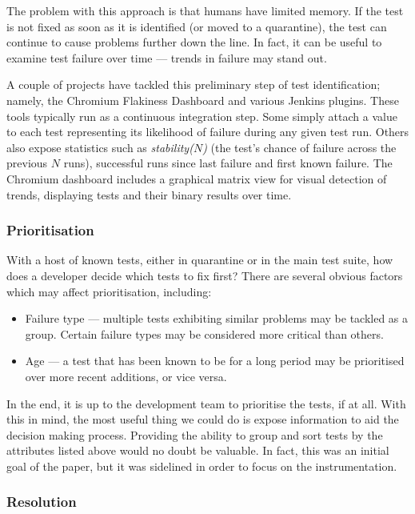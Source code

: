 The problem with this approach is that humans have limited memory. If the \flaky
test is not fixed as soon as it is identified (or moved to a quarantine), the
test can continue to cause problems further down the line. In fact, it can be
useful to examine test failure over time --- trends in failure may stand out.

A couple of projects have tackled this preliminary step of \flaky test
identification; namely, the Chromium Flakiness
Dashboard\cite{flakinessDashboard} and various Jenkins plugins. These tools
typically run as a continuous integration step. Some simply attach a value to
each test representing its likelihood of failure during any given test run.
Others also expose statistics such as \emph{stability($N$)} (the test's chance
of failure across the previous $N$ runs), successful runs since last failure and
first known failure. The Chromium dashboard includes a graphical matrix view for
visual detection of trends, displaying tests and their binary results over time.

\subsubsection{Prioritisation}

With a host of known \flaky tests, either in quarantine or in the main test
suite, how does a developer decide which tests to fix first? There are several
obvious factors which may affect prioritisation, including:
\begin{itemize}
	\item Failure type --- multiple \flaky tests exhibiting similar problems may
	be tackled as a group. Certain failure types may be considered more critical than others.
	\item Age --- a \flaky test that has been known to be \flaky for a long period
	may be prioritised over more recent additions, or vice versa.
\end{itemize}

In the end, it is up to the development team to prioritise the \flaky tests, if
at all. With this in mind, the most useful thing we could do is expose
information to aid the decision making process. Providing the ability to group
and sort \flaky tests by the attributes listed above would no doubt be valuable.
In fact, this was an initial goal of the paper, but it was sidelined in order to
focus on the instrumentation.

\subsubsection{Resolution}

